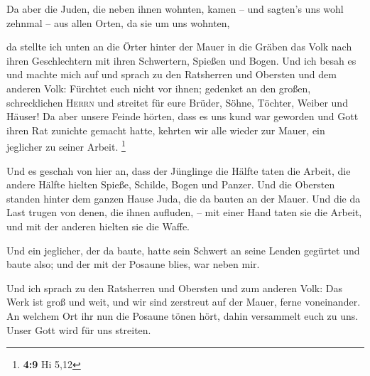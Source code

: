  Da aber die Juden, die neben ihnen wohnten, kamen -- und
sagten's uns wohl zehnmal -- aus allen Orten, da sie um uns wohnten,

 da stellte ich unten an die Örter hinter der Mauer in die
Gräben das Volk nach ihren Geschlechtern mit ihren Schwertern, Spießen
und Bogen.  Und ich besah es und machte mich auf und
sprach zu den Ratsherren und Obersten und dem anderen Volk: Fürchtet
euch nicht vor ihnen; gedenket an den großen, schrecklichen
\textsc{Herrn} und streitet für eure Brüder, Söhne, Töchter, Weiber und
Häuser!  Da aber unsere Feinde hörten, dass es uns kund
war geworden und Gott ihren Rat zunichte gemacht hatte, kehrten wir alle
wieder zur Mauer, ein jeglicher zu seiner Arbeit. \footnote{\textbf{4:9}
  Hi 5,12}

 Und es geschah von hier an, dass der Jünglinge die
Hälfte taten die Arbeit, die andere Hälfte hielten Spieße, Schilde,
Bogen und Panzer. Und die Obersten standen hinter dem ganzen Hause Juda,
 die da bauten an der Mauer. Und die da Last trugen von
denen, die ihnen aufluden, -- mit einer Hand taten sie die Arbeit, und
mit der anderen hielten sie die Waffe.

 Und ein jeglicher, der da baute, hatte sein Schwert an
seine Lenden gegürtet und baute also; und der mit der Posaune blies, war
neben mir.

 Und ich sprach zu den Ratsherren und Obersten und zum
anderen Volk: Das Werk ist groß und weit, und wir sind zerstreut auf der
Mauer, ferne voneinander.  An welchem Ort ihr nun die
Posaune tönen hört, dahin versammelt euch zu uns. Unser Gott wird für
uns streiten.


